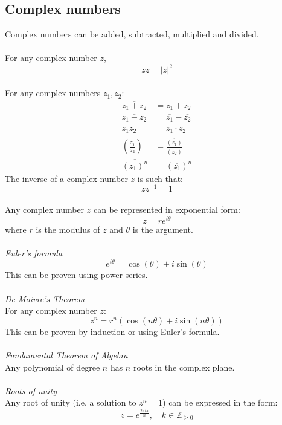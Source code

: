 \documentclass{scrartcl}
\newcommand{\Z}{\mathbb{Z}}
\begin{document}
\subsection{Complex numbers}
Complex numbers can be added, subtracted, multiplied and divided.
\\\\
For any complex number $ z $,
\begin{equation}
z \overline{z} = |z| ^{2}
\end{equation}
\\
For any complex numbers $ z_{1}, z_{2} $:
\begin{align}
\overline{z_{1} + z_{2}} & = \overline{z_{1}} + \overline{z_{2}} \\
\overline{z_{1} - z_{2}} & = \overline{z_{1}} - \overline{z_{2}} \\
\overline{z_{1} z_{2}} & = \overline{z_{1}} \cdot \overline{z_{2}} \\
\overline{(\frac{z_{1}}{z_{2}})} & = \frac{\overline{(z_{1})}}{\overline{(z_{2})}} \\
\overline{(z_{1})^{n}} & = (\overline{z_{1}})^{n}
\end{align}
The inverse of a complex number $ z $ is such that:
\begin{equation}
z z^{-1} = 1
\end{equation}
\\
Any complex number $ z $ can be represented in exponential form:
\begin{equation}
z = r e^{i \theta}
\end{equation}
where $ r $ is the modulus of $ z $ and $ \theta $ is the argument.
\\\\
\textit{Euler's formula}
\begin{equation}
e^{i \theta} = \cos(\theta) + i \sin(\theta)
\end{equation}
This can be proven using power series.
\\\\
\textit{De Moivre's Theorem}
\\
For any complex number $ z $:
\begin{equation}
z^{n} = r^{n} (\cos(n \theta) + i \sin(n \theta))
\end{equation}
This can be proven by induction or using Euler's formula.
\\\\
\textit{Fundamental Theorem of Algebra}
\\
Any polynomial of degree $ n $ has $ n $ roots in the complex plane.
\\\\
\textit{Roots of unity}
\\
Any root of unity (i.e. a solution to $ z^{n} = 1 $) can be expressed in the form:
\begin{equation}
z = e^{\frac{2 \pi k i}{n}}, \quad k \in \Z_{\geq 0}
\end{equation}
\end{document}
